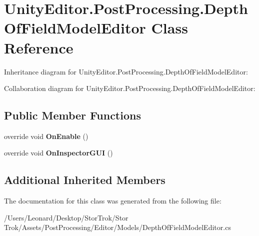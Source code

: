 \hypertarget{class_unity_editor_1_1_post_processing_1_1_depth_of_field_model_editor}{}\section{Unity\+Editor.\+Post\+Processing.\+Depth\+Of\+Field\+Model\+Editor Class Reference}
\label{class_unity_editor_1_1_post_processing_1_1_depth_of_field_model_editor}


Inheritance diagram for Unity\+Editor.\+Post\+Processing.\+Depth\+Of\+Field\+Model\+Editor\+:


Collaboration diagram for Unity\+Editor.\+Post\+Processing.\+Depth\+Of\+Field\+Model\+Editor\+:
\subsection*{Public Member Functions}
\begin{DoxyCompactItemize}
\item 
\mbox{\label{class_unity_editor_1_1_post_processing_1_1_depth_of_field_model_editor_a734cf645dac2b322e98d85ad7652dd2a}} 
override void {\bfseries On\+Enable} ()
\item 
\mbox{\label{class_unity_editor_1_1_post_processing_1_1_depth_of_field_model_editor_a16d6393fb53a11e086f8caac90166b25}} 
override void {\bfseries On\+Inspector\+G\+UI} ()
\end{DoxyCompactItemize}
\subsection*{Additional Inherited Members}


The documentation for this class was generated from the following file\+:\begin{DoxyCompactItemize}
\item 
/\+Users/\+Leonard/\+Desktop/\+Stor\+Trok/\+Stor Trok/\+Assets/\+Post\+Processing/\+Editor/\+Models/Depth\+Of\+Field\+Model\+Editor.\+cs\end{DoxyCompactItemize}
